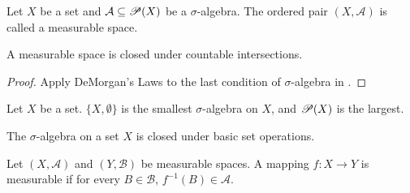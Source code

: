 \documentclass[class=book, crop=false]{standalone}
\begin{document}
        \begin{definition}
            Let $X$ be a set and $\mathcal{A} \subseteq \mathscr{P}(X)$ be a $\sigma$-algebra. The ordered pair $(X, \mathcal{A})$ is called a measurable space.
        \end{definition}
        
        \begin{theorem}
            A measurable space is closed under countable intersections.
        \end{theorem}
        \begin{proof}
            Apply DeMorgan's Laws to the last condition of $\sigma$-algebra in .
        \end{proof}

        \begin{theorem}
            Let $X$ be a set. $\{X, \emptyset\}$ is the smallest $\sigma$-algebra on $X$, and $\mathscr{P}(X)$ is the largest.
        \end{theorem}

        \begin{remark}
            The $\sigma$-algebra on a set $X$ is closed under basic set operations.
        \end{remark}

        \begin{definition}
            Let $(X, \mathcal{A})$ and $(Y, \mathcal{B})$ be measurable spaces. A mapping $f : X \rightarrow Y$ is measurable if for every $B \in \mathcal{B}$, $f^{-1}(B) \in \mathcal{A}$.
        \end{definition}
\end{document}
